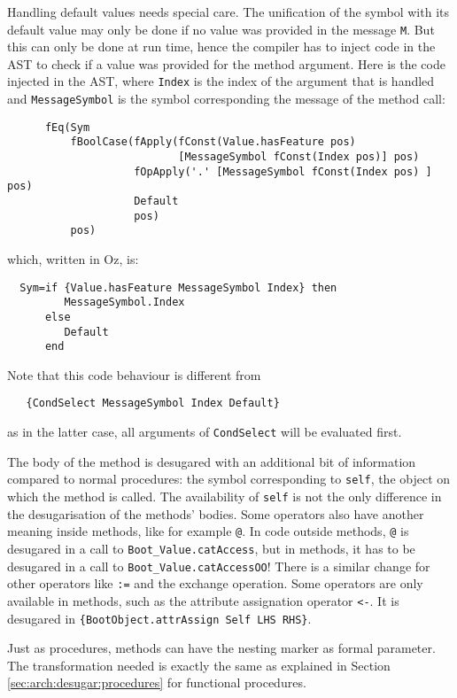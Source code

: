 \documentclass[a4paper]{memoir}
\begin{document}
Handling default values needs special care. The unification of the symbol with its default value may only be done
if no value was provided in the message \lstinline!M!. But this can only be done at run time, hence the compiler
has to inject code in the AST to check if a value was provided for the method argument.
Here is the code injected in the AST, where \lstinline!Index! is the index of the argument that is handled and 
\lstinline!MessageSymbol! is the symbol corresponding the message of the method
call:
\begin{lstlisting}
      fEq(Sym 
          fBoolCase(fApply(fConst(Value.hasFeature pos) 
                           [MessageSymbol fConst(Index pos)] pos)
                    fOpApply('.' [MessageSymbol fConst(Index pos) ] pos)
                    Default 
                    pos) 
          pos)
\end{lstlisting}
which, written in Oz, is:
\begin{lstlisting}
  Sym=if {Value.hasFeature MessageSymbol Index} then 
         MessageSymbol.Index 
      else
         Default
      end
\end{lstlisting}

Note that this code behaviour is different from 
\begin{lstlisting}
   {CondSelect MessageSymbol Index Default}
\end{lstlisting}
as in the latter case, all arguments of \lstinline!CondSelect! will be evaluated
first. 

The body of the method is desugared with an additional bit of information compared to normal procedures: the symbol corresponding to \lstinline!self!, the object on which the method is called. 
The availability of \lstinline!self! is not the only difference in the desugarisation of the methods' bodies. Some operators also have another meaning inside methods, like for example \lstinline!@!.
In code outside methods, \lstinline!@! is desugared in a call to
\lstinline!Boot_Value.catAccess!, but in methods, it has to be desugared in a
call to \lstinline!Boot_Value.catAccessOO!! There is a similar change for other
operators like \lstinline!:=! and the exchange operation.
Some operators are only available in methods, such as the attribute assignation
operator \lstinline!<-!. It is desugared in 
\lstinline!{BootObject.attrAssign Self LHS RHS}!.

Just as procedures, methods can have the nesting marker as formal parameter. The transformation needed
is exactly the same as explained in Section \ref{sec:arch:desugar:procedures} for functional procedures.
\end{document}
